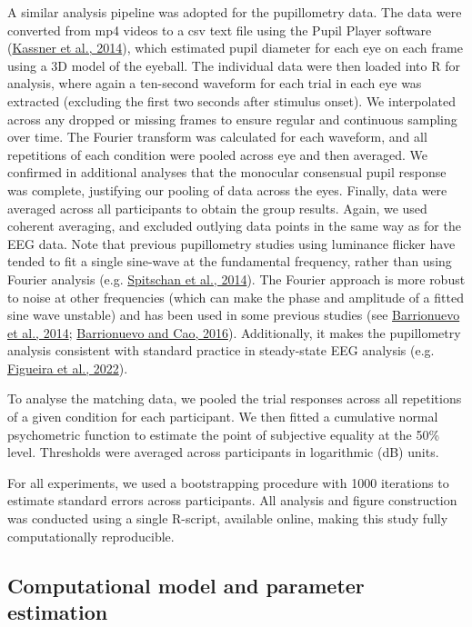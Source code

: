 \documentclass[
]{article}
\begin{document}
A similar analysis pipeline was adopted for the pupillometry data. The data were converted from mp4 videos to a csv text file using the Pupil Player software (\protect\hyperlink{ref-Kassner2014}{Kassner et al., 2014}), which estimated pupil diameter for each eye on each frame using a 3D model of the eyeball. The individual data were then loaded into R for analysis, where again a ten-second waveform for each trial in each eye was extracted (excluding the first two seconds after stimulus onset). We interpolated across any dropped or missing frames to ensure regular and continuous sampling over time. The Fourier transform was calculated for each waveform, and all repetitions of each condition were pooled across eye and then averaged. We confirmed in additional analyses that the monocular consensual pupil response was complete, justifying our pooling of data across the eyes. Finally, data were averaged across all participants to obtain the group results. Again, we used coherent averaging, and excluded outlying data points in the same way as for the EEG data. Note that previous pupillometry studies using luminance flicker have tended to fit a single sine-wave at the fundamental frequency, rather than using Fourier analysis (e.g. \protect\hyperlink{ref-Spitschan2014}{Spitschan et al., 2014}). The Fourier approach is more robust to noise at other frequencies (which can make the phase and amplitude of a fitted sine wave unstable) and has been used in some previous studies (see \protect\hyperlink{ref-Barrionuevo2014}{Barrionuevo et al., 2014}; \protect\hyperlink{ref-Barrionuevo2016}{Barrionuevo and Cao, 2016}). Additionally, it makes the pupillometry analysis consistent with standard practice in steady-state EEG analysis (e.g. \protect\hyperlink{ref-Figueira2022}{Figueira et al., 2022}).

To analyse the matching data, we pooled the trial responses across all repetitions of a given condition for each participant. We then fitted a cumulative normal psychometric function to estimate the point of subjective equality at the 50\% level. Thresholds were averaged across participants in logarithmic (dB) units.

For all experiments, we used a bootstrapping procedure with 1000 iterations to estimate standard errors across participants. All analysis and figure construction was conducted using a single R-script, available online, making this study fully computationally reproducible.

\hypertarget{computational-model-and-parameter-estimation}{%
\subsection{Computational model and parameter estimation}\label{computational-model-and-parameter-estimation}}
\end{document}
